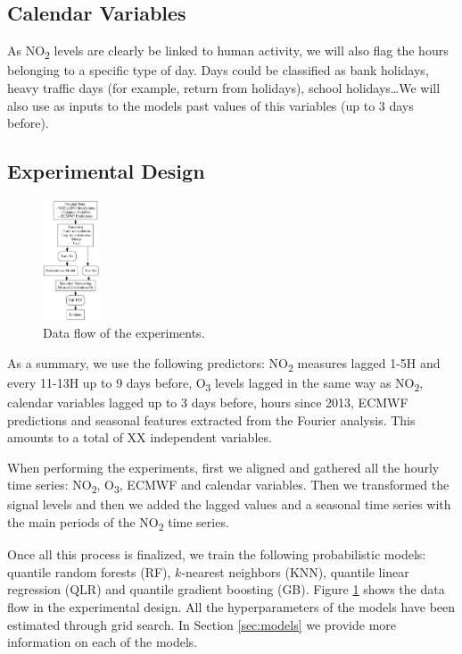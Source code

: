 \documentclass[a4paper,twocolumn,5p]{elsarticle}
\begin{document}
\subsection{Calendar Variables}
\label{sec:cal_data}

As NO\textsubscript{2} levels are clearly be linked to human activity,
we will also flag the hours belonging to a specific type of day. Days
could be classified as bank holidays, heavy traffic days (for example,
return from holidays), school holidays\ldots We will also use as
inputs to the models past values of this variables (up to 3 days
before).

\subsection{Experimental Design}
\label{sec:experimental-design}

\begin{figure}
  \centering
  \includegraphics[width=0.15\textwidth]{diagrams/flow}
  \caption{\label{figure:dataflow}Data flow of the
    experiments.}
\end{figure}

As a summary, we use the following predictors: NO\textsubscript{2}
measures lagged 1-5H and every 11-13H up to 9 days before,
O\textsubscript{3} levels lagged in the same way as
NO\textsubscript{2}, calendar variables lagged up to 3 days before,
hours since 2013, ECMWF predictions and seasonal features extracted
from the Fourier analysis. This amounts to a total of XX independent
variables. 

When performing the experiments, first we aligned and gathered all the
hourly time series: NO\textsubscript{2}, O\textsubscript{3}, ECMWF and
calendar variables.  Then we transformed the signal levels and then we
added the lagged values and a seasonal time series with the main
periods of the NO\textsubscript{2} time series.

Once all this process is finalized, we train the following
probabilistic models: quantile random forests (RF), $k$-nearest
neighbors (KNN), quantile linear regression (QLR) and quantile
gradient boosting (GB).  Figure \ref{figure:dataflow} shows the data
flow in the experimental design. All the hyperparameters of the models
have been estimated through grid search.  In Section \ref{sec:models}
we provide more information on each of the models.
\end{document}
